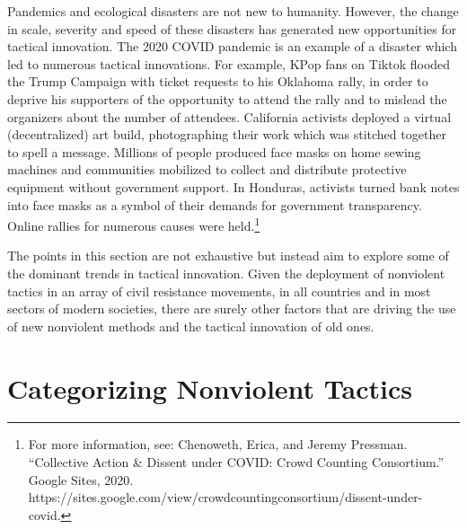 \documentclass[twoside,a4paper,12pt,fleqn,openany]{extbook}
\begin{document}
Pandemics and ecological disasters are not new to humanity. However, the change in scale, severity and speed of these disasters has generated new opportunities for tactical innovation. The 2020 COVID pandemic is an example of a disaster which led to numerous tactical innovations. For example, KPop fans on Tiktok flooded the Trump Campaign with ticket requests to his Oklahoma rally, in order to deprive his supporters of the opportunity to attend the rally and to mislead the organizers about the number of attendees. California activists deployed a virtual (decentralized) art build, photographing their work which was stitched together to spell a message. Millions of people produced face masks on home sewing machines and communities mobilized to collect and distribute protective equipment without government support. In Honduras, activists turned bank notes into face masks as a symbol of their demands for government transparency. Online rallies for numerous causes were held.\footnote{For more information, see: Chenoweth, Erica, and Jeremy Pressman. “Collective Action & Dissent under COVID: Crowd Counting Consortium.” Google Sites, 2020. https://sites.google.com/view/crowdcountingconsortium/dissent-under-covid.}

The points in this section are not exhaustive but instead aim to explore some of the dominant trends in tactical innovation. Given the deployment of nonviolent tactics in an array of civil resistance movements, in all countries and in most sectors of modern societies, there are surely other factors that are driving the use of new nonviolent methods and the tactical innovation of old ones.

\chapter{Categorizing Nonviolent Tactics}
\end{document}
